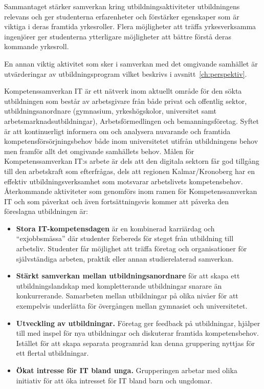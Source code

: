 Sammantaget stärker samverkan kring utbildningsaktiviteter utbildningens relevans och ger studenterna erfarenheter och förstärker egenskaper som är viktiga i deras framtida yrkesroller. Flera möjligheter att träffa yrkesverksamma ingenjörer ger studenterna ytterligare möjligheter att bättre förstå deras kommande yrkesroll.

En annan viktig aktivitet som sker i samverkan med det omgivande samhället är utvärderingar av utbildningsprogram vilket beskrivs i avsnitt~\ref{ch:perspektiv}.

Kompetenssamverkan IT är ett nätverk inom aktuellt område för den sökta utbildningen som består av arbetsgivare från både privat och offentlig sektor, utbildningsanordnare (gymnasium, yrkeshögskolor, universitet samt arbetsmarknadsutbildningar), Arbetsförmedlingen och bemanningsföretag. Syftet är att kontinuerligt informera om och analysera nuvarande och framtida kompetensförsörjningsbehov både inom universitetet utifrån utbildningens behov men framför allt det omgivande samhällets behov. Målen för Kompetenssamverkan IT:s arbete är dels att den digitala sektorn får god tillgång till den arbetskraft som efterfrågas, dels att regionen Kalmar/Kronoberg har en effektiv utbildningsverksamhet som motsvarar arbetslivets kompetensbehov. Återkommande aktiviteter som genomförs inom ramen för Kompetenssamverkan IT och som påverkat och även fortsättningsvis kommer att påverka den föreslagna utbildningen är:

\begin{itemize}
\item
  \textbf{Stora IT-kompetensdagen} är en kombinerad karriärdag och ``exjobbsmässa'' där studenter förbereds för steget från utbildning till arbetsliv. Studenter får möjlighet att träffa företag och organisationer för självständiga arbeten, praktik eller annan studierelaterad samverkan.
\item
  \textbf{Stärkt samverkan mellan utbildningsanordnare} för att skapa ett utbildningslandskap med kompletterande utbildningar snarare än konkurrerande. Samarbeten mellan utbildningar på olika nivåer för att exempelvis underlätta för övergången mellan gymnasiet och universitetet.
\item
  \textbf{Utveckling av utbildningar.} Företag ger feedback på utbildningar, hjälper till med inspel för nya utbildningar och diskuterar framtida kompetensbehov. Istället för att skapa separata programråd kan denna gruppering nyttjas för ett flertal utbildningar.
\item
  \textbf{Ökat intresse för IT bland unga.} Grupperingen arbetar med olika initiativ för att öka intresset för IT bland barn och ungdomar.
\end{itemize}